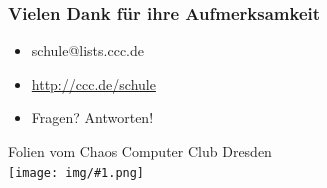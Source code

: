 \documentclass[14pt,handout]{beamer}
\newcommand{\cc}[1]{\texttt{[image: img/\#1.png]}}
\begin{document}
\begin{frame}
    \frametitle{Vielen Dank für ihre Aufmerksamkeit}
    \begin{itemize}
        \item schule@lists.ccc.de
        \item \url{http://ccc.de/schule}
        \item Fragen? Antworten!
    \end{itemize}
    \begin{center}
   Folien vom Chaos Computer Club Dresden\\
   {\cc{by-sa}}
   \end{center}
\end{frame}
\end{document}
